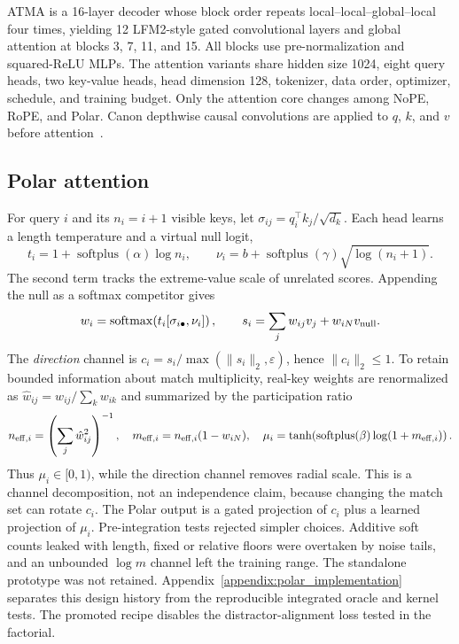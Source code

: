 \documentclass{article}
\begin{document}
ATMA is a 16-layer decoder whose block order repeats local--local--global--local four times, yielding 12 LFM2-style gated convolutional layers and global attention at blocks 3, 7, 11, and 15. All blocks use pre-normalization and squared-ReLU MLPs. The attention variants share hidden size 1024, eight query heads, two key-value heads, head dimension 128, tokenizer, data order, optimizer, schedule, and training budget. Only the attention core changes among NoPE, RoPE, and Polar. Canon depthwise causal convolutions are applied to $q$, $k$, and $v$ before attention~\citep{physics_lms_2025}.

\subsection{Polar attention}

For query $i$ and its $n_i=i+1$ visible keys, let $\sigma_{ij}=q_i^\top k_j/\sqrt{d_k}$. Each head learns a length temperature and a virtual null logit,
\begin{equation}
 t_i=1+\operatorname{softplus}(\alpha)\log n_i,\qquad
 \nu_i=b+\operatorname{softplus}(\gamma)\sqrt{\log(n_i+1)}.
\label{eq:length}
\end{equation}
The second term tracks the extreme-value scale of unrelated scores. Appending the null as a softmax competitor gives
\begin{equation}
 w_i=\operatorname{softmax}\!\left(t_i[\sigma_{i\bullet},\nu_i]\right),\qquad
 s_i=\sum_jw_{ij}v_j+w_{iN}v_{\rm null}.
\end{equation}
The \emph{direction} channel is $c_i=s_i/\max(\lVert s_i\rVert_2,\varepsilon)$, hence $\lVert c_i\rVert_2\leq1$. To retain bounded information about match multiplicity, real-key weights are renormalized as $\hat w_{ij}=w_{ij}/\sum_kw_{ik}$ and summarized by the participation ratio
\begin{equation}
 n_{{\rm eff},i}=\left(\sum_j\hat w_{ij}^2\right)^{-1},\quad
 m_{{\rm eff},i}=n_{{\rm eff},i}(1-w_{iN}),\quad
 \mu_i=\tanh\!\left(\operatorname{softplus}(\beta)\log(1+m_{{\rm eff},i})\right).
\end{equation}
Thus $\mu_i\in[0,1)$, while the direction channel removes radial scale. This is a channel decomposition, not an independence claim, because changing the match set can rotate $c_i$. The Polar output is a gated projection of $c_i$ plus a learned projection of $\mu_i$. Pre-integration tests rejected simpler choices. Additive soft counts leaked with length, fixed or relative floors were overtaken by noise tails, and an unbounded $\log m$ channel left the training range. The standalone prototype was not retained. Appendix~\ref{appendix:polar_implementation} separates this design history from the reproducible integrated oracle and kernel tests. The promoted recipe disables the distractor-alignment loss tested in the factorial.
\end{document}
